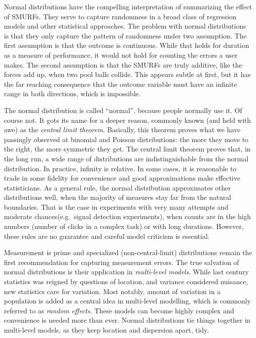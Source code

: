 \documentclass[]{svmono}
\theoremstyle{definition}
\theoremstyle{definition}
\theoremstyle{definition}
\theoremstyle{remark}
\begin{document}
Normal distributions have the compelling interpretation of summarizing
the effect of SMURFs. They serve to capture randomness in a broad class
of regression models and other statistical approaches. The problem with
normal distributions is that they only capture the pattern of randomness
under two assumption. The first assumption is that the outcome is
continuous. While that holds for duration as a measure of performance,
it would not hold for counting the errors a user makes. The second
assumption is that the SMURFs are truly additive, like the forces add
up, when two pool balls collide. This appears subtle at first, but it
has the far reaching consequence that the outcome variable must have an
infinite range in both directions, which is impossible.

The normal distribution is called ``normal'', because people normally
use it. Of course not. It gots its name for a deeper reason, commonly
known (and held with awe) as the \emph{central limit theorem}.
Basically, this theorem proves what we have passingly observed at
binomial and Poisson distributions: the more they move to the right, the
more symmetric they get. The central limit theorem proves that, in the
long run, a wide range of distributions are indistinguishable from the
normal distribution. In practice, infinity is relative. In some cases,
it is reasonable to trade in some fidelity for convenience and good
approximations make effective statisticians. As a general rule, the
normal distribution approximates other distributions well, when the
majority of measures stay far from the natural boundaries. That is the
case in experiments with very many attempts and moderate
chances(e.g.~signal detection experiments), when counts are in the high
numbers (number of clicks in a complex task) or with long durations.
However, these rules are no guarantee and careful model criticism is
essential.

Measurement is prime and specialized (non-central-limit) distributions
remain the first recommendation for capturing measurement errors. The
true salvation of normal distributions is their application in
\emph{multi-level models}. While last century statistics was reigned by
questions of location, and variance considered nuisance, new statistics
care for variation. Most notably, amount of variation in a population is
added as a central idea in multi-level modelling, which is commonly
referred to as \emph{random effects}. These models can become highly
complex and convenience is needed more than ever. Normal distributions
tie things together in multi-level models, as they keep location and
dispersion apart, tidy.
\end{document}
